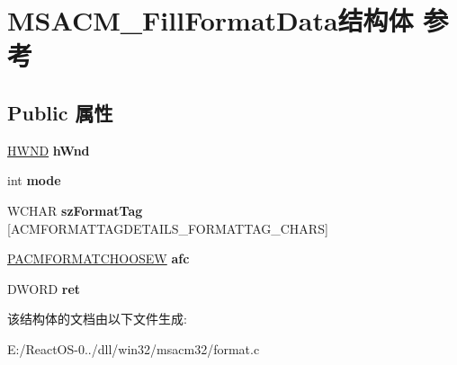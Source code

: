 \hypertarget{struct_m_s_a_c_m___fill_format_data}{}\section{M\+S\+A\+C\+M\+\_\+\+Fill\+Format\+Data结构体 参考}
\label{struct_m_s_a_c_m___fill_format_data}
\subsection*{Public 属性}
\begin{DoxyCompactItemize}
\item 
\mbox{\label{struct_m_s_a_c_m___fill_format_data_adab178a7aa2abc6ebafa1db5055b94d6}} 
\hyperlink{interfacevoid}{H\+W\+ND} {\bfseries h\+Wnd}
\item 
\mbox{\label{struct_m_s_a_c_m___fill_format_data_a5dc54e4e6618d891c60d168c5241ff14}} 
int {\bfseries mode}
\item 
\mbox{\label{struct_m_s_a_c_m___fill_format_data_a1155be461db95e41ef6b849b7f9e65d5}} 
W\+C\+H\+AR {\bfseries sz\+Format\+Tag} \mbox{[}A\+C\+M\+F\+O\+R\+M\+A\+T\+T\+A\+G\+D\+E\+T\+A\+I\+L\+S\+\_\+\+F\+O\+R\+M\+A\+T\+T\+A\+G\+\_\+\+C\+H\+A\+RS\mbox{]}
\item 
\mbox{\label{struct_m_s_a_c_m___fill_format_data_ad049d710f92ddcc7cb5da90308af28f0}} 
\hyperlink{struct___a_c_m_f_o_r_m_a_t_c_h_o_o_s_e_w}{P\+A\+C\+M\+F\+O\+R\+M\+A\+T\+C\+H\+O\+O\+S\+EW} {\bfseries afc}
\item 
\mbox{\label{struct_m_s_a_c_m___fill_format_data_aaf683c2722abd09f093bbaf0b0a35ffc}} 
D\+W\+O\+RD {\bfseries ret}
\end{DoxyCompactItemize}


该结构体的文档由以下文件生成\+:\begin{DoxyCompactItemize}
\item 
E\+:/\+React\+O\+S-\/0../dll/win32/msacm32/format.\+c\end{DoxyCompactItemize}
